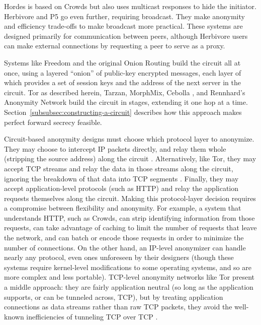 \documentclass[times,10pt,twocolumn]{article}
\begin{document}
Hordes \cite{hordes-jcs} is based on Crowds but also uses multicast
responses to hide the initiator. Herbivore \cite{herbivore} and P5
\cite{p5} go even further, requiring broadcast. They make anonymity
and efficiency trade-offs to make broadcast more practical.
These systems are designed primarily for communication between peers,
although Herbivore users can make external connections by
requesting a peer to serve as a proxy.

Systems like Freedom and the original Onion Routing build the circuit
all at once, using a layered ``onion'' of public-key encrypted messages,
each layer of which provides a set of session keys and the address of the
next server in the circuit. Tor as described herein, Tarzan, MorphMix,
Cebolla \cite{cebolla}, and Rennhard's Anonymity Network \cite{anonnet}
build the circuit
in stages, extending it one hop at a time.
Section~\ref{subsubsec:constructing-a-circuit} describes how this
approach makes perfect forward secrecy feasible.

Circuit-based anonymity designs must choose which protocol layer
to anonymize. They may choose to intercept IP packets directly, and
relay them whole (stripping the source address) along the circuit
\cite{freedom2-arch,tarzan:ccs02}.  Alternatively, like
Tor, they may accept TCP streams and relay the data in those streams
along the circuit, ignoring the breakdown of that data into TCP segments
\cite{morphmix:fc04,anonnet}. Finally, they may accept application-level
protocols (such as HTTP) and relay the application requests themselves
along the circuit.  
Making this protocol-layer decision requires a compromise between flexibility
and anonymity.  For example, a system that understands HTTP, such as Crowds,
can strip
identifying information from those requests, can take advantage of caching
to limit the number of requests that leave the network, and can batch
or encode those requests in order to minimize the number of connections.
On the other hand, an IP-level anonymizer can handle nearly any protocol,
even ones unforeseen by their designers (though these systems require
kernel-level modifications to some operating systems, and so are more
complex and less portable). TCP-level anonymity networks like Tor present
a middle approach: they are fairly application neutral (so long as the
application supports, or can be tunneled across, TCP), but by treating
application connections as data streams rather than raw TCP packets,
they avoid the well-known inefficiencies of tunneling TCP over TCP
\cite{tcp-over-tcp-is-bad}.
\end{document}
